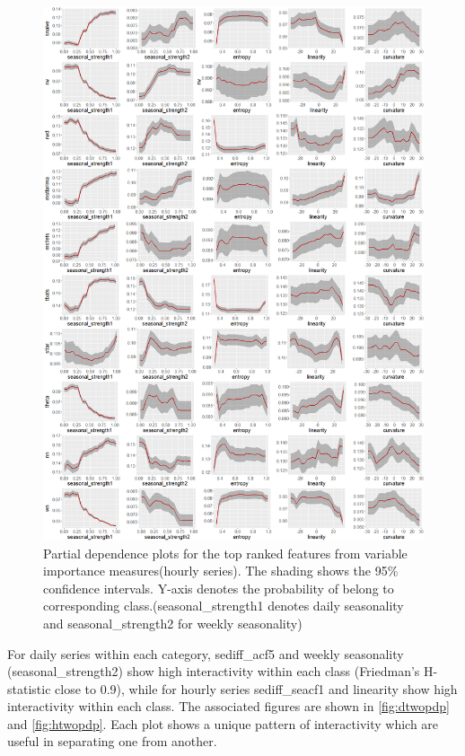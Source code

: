 \documentclass[11pt,a4paper,]{article}
\begin{document}
\begin{figure}
\centering
\includegraphics{figures/hourlypdp-1.png}
\caption{\label{fig:hourlypdp}Partial dependence plots for the top ranked
features from variable importance measures(hourly series). The shading
shows the 95\% confidence intervals. Y-axis denotes the probability of
belong to corresponding class.(seasonal\_strength1 denotes daily
seasonality and seasonal\_strength2 for weekly seasonality)}
\end{figure}

For daily series within each category, sediff\_acf5 and weekly
seasonality (seasonal\_strength2) show high interactivity within each
class (Friedman's H-statistic close to 0.9), while for hourly series
sediff\_seacf1 and linearity show high interactivity within each class.
The associated figures are shown in \autoref{fig:dtwopdp} and
\autoref{fig:htwopdp}. Each plot shows a unique pattern of interactivity
which are useful in separating one from another.
\end{document}
